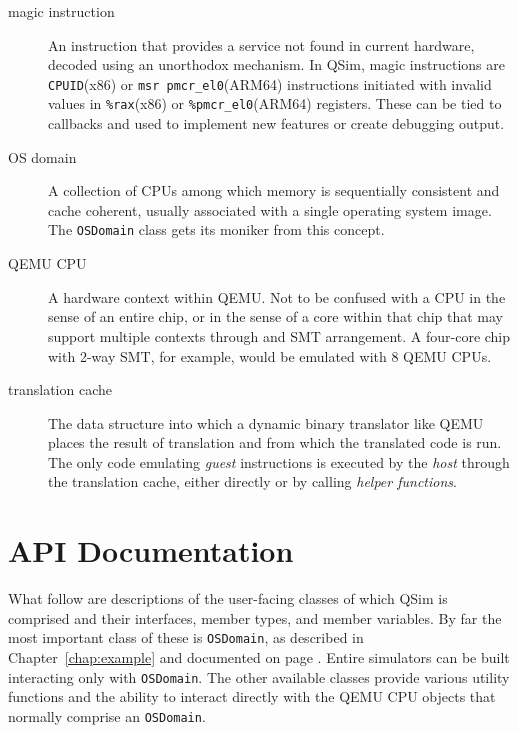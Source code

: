 \documentclass[letterpaper, 10pt]{book}
\begin{document}
\begin{description}
\item[magic instruction]
An instruction that provides a service not found in current hardware,
decoded using an unorthodox mechanism. In QSim, magic instructions are
\texttt{CPUID}(x86) or \texttt{msr pmcr\_el0}(ARM64) instructions initiated with
invalid values in \texttt{\%rax}(x86) or \texttt{\%pmcr\_el0}(ARM64) registers.
These can be tied to callbacks and used to implement new features or create
debugging output.

\item[OS domain]
A collection of CPUs among which memory is sequentially consistent and cache
coherent, usually associated with a single operating system image. The 
\texttt{OSDomain} class gets its moniker from this concept.

\item[QEMU CPU]
A hardware context within QEMU. Not to be confused with a CPU in the sense
of an entire chip, or in the sense of a core within that chip that may 
support multiple contexts through and SMT arrangement. A four-core chip with
2-way SMT, for example, would be emulated with 8 QEMU CPUs.

\item[translation cache] 
The data structure into which a dynamic binary translator like QEMU places the
result of translation and from which the translated code is run. The only
code emulating \emph{guest} instructions is executed by the \emph{host}
through the translation cache, either directly or by calling 
\emph{helper functions}.
\end{description}

\appendix
\chapter{API Documentation}

What follow are descriptions of the user-facing classes of which QSim is 
comprised and their interfaces, member types, and member variables. By far
the most important class of these is \texttt{OSDomain}, as described in
Chapter~\ref{chap:example} and documented on page \pageref{class:OSDomain}.
Entire simulators can be built interacting only with \texttt{OSDomain}. The
other available classes provide various utility functions and the ability to
interact directly with the QEMU CPU objects that normally comprise an
\texttt{OSDomain}.

\newpage
\end{document}
